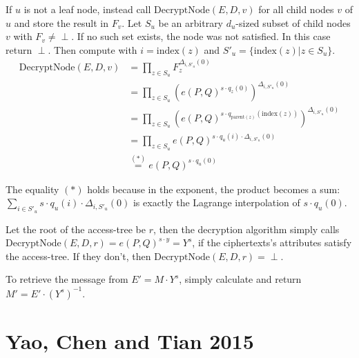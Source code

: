 If $u$ is not a leaf node, instead call $\text{DecryptNode}(E, D, v)$ for all child nodes $v$ of $u$ and store the result in $F_v$.
Let $S_u$ be an arbitrary $d_u$-sized subset of child nodes $v$ with $F_v \neq \perp$. If no such set exists, the node was not satisfied. In this case return $\perp$.
Then compute with $i = \text{index}(z)$ and $S'_u = \{\text{index}(z) | z \in S_u\}$.
\begin{equation*}
    \begin{split}
        \text{DecryptNode}(E, D, v) &= \prod_{z \in S_u} F_z^{\Delta_{i,S'_u}(0)}\\
        &= \prod_{z \in S_u} (e(P,Q)^{s\cdot q_z(0)})^{\Delta_{i,S'_u}(0)}\\
        &= \prod_{z \in S_u} (e(P,Q)^{s\cdot q_{\text{parent}(z)}(\text{index}(z))})^{\Delta_{i,S'_u}(0)}\\
        &= \prod_{z \in S_u} e(P,Q)^{s\cdot q_u(i) \cdot \Delta_{i,S'_u}(0)}\\
        &\stackrel{(*)}{=} e(P,Q)^{s \cdot q_u(0)}
    \end{split}
\end{equation*}

The equality $(*)$ holds because in the exponent, the product becomes a sum: $\sum_{i\in S'_u} s \cdot q_u(i) \cdot \Delta_{i,S'_u}(0)$ is exactly the Lagrange interpolation of $s \cdot q_u(0)$.

Let the root of the \gls{access-tree} be $r$, then the decryption algorithm simply calls $\text{DecryptNode}(E, D, r) = e(P,Q)^{s \cdot y} = Y^s$, if the ciphertexts's attributes satisfy the \gls{access-tree}.
If they don't, then $\text{DecryptNode}(E, D, r) = \perp$.

To retrieve the message from $E' = M \cdot Y^s$, simply calculate and return $M' = E' \cdot (Y^s)^{-1}$.


\section{Yao, Chen and Tian 2015}\label{sec:yct}

